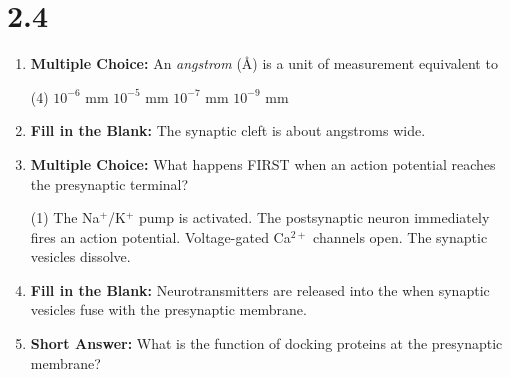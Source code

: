 \squigglyline

\section*{2.4}
\begin{enumerate}[label=\textbf{Q2.4.\arabic*}]
      
      \item \textbf{Multiple Choice:} An \textit{angstrom} (\AA) is a unit of measurement equivalent to
      \begin{tasks}[label=\textcolor{\documentTheme}{(\Alph*)}, item-format=\color{\documentTheme}, label-width=1.5em, item-indent=1.7em](4)
            \task \(10^{-6}\) mm
            \task \(10^{-5}\) mm
            \task \(10^{-7}\) mm
            \task \(10^{-9}\) mm
      \end{tasks}
      
      \item \textbf{Fill in the Blank:} The synaptic cleft is about \underline{\hspace{3cm}} angstroms wide. \\

      \item \textbf{Multiple Choice:} What happens FIRST when an action potential reaches the presynaptic terminal?
            \begin{tasks}[label=\textcolor{\documentTheme}{(\Alph*)}, item-format=\color{\documentTheme}, label-width=1.5em, item-indent=1.7em](1)
                  \task The Na\(^+\)/K\(^+\) pump is activated.
                  \task The postsynaptic neuron immediately fires an action potential.
                  \task Voltage-gated Ca\(^{2+}\) channels open.
                  \task The synaptic vesicles dissolve.
            \end{tasks}

      \item \textbf{Fill in the Blank:} Neurotransmitters are released into the \underline{\hspace{3cm}} when synaptic vesicles fuse with the presynaptic membrane. \\

      \item \textbf{Short Answer:} What is the function of docking proteins at the presynaptic membrane? \\

            
            

\end{enumerate}

